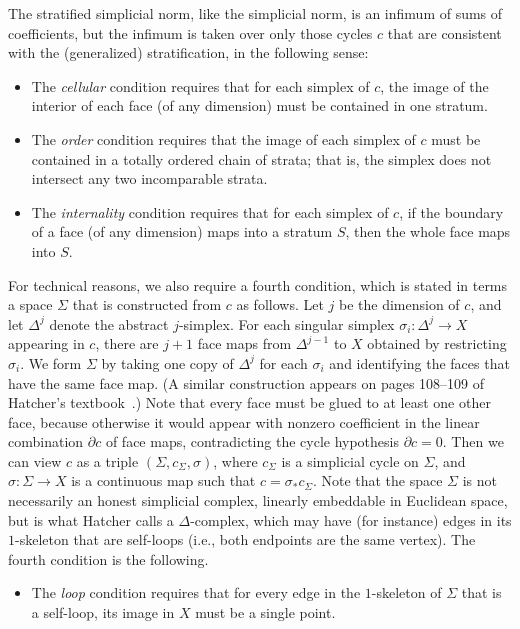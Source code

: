 \documentclass[psamsfonts]{amsart}
\theoremstyle{remark}
\newcommand{\del}{\partial}
\begin{document}
The stratified simplicial norm, like the simplicial norm, is an infimum of sums of coefficients, but the infimum is taken over only those cycles $c$ that are consistent with the (generalized) stratification, in the following sense:
\begin{itemize}
\item The \emph{cellular} condition requires that for each simplex of $c$, the image of the interior of each face (of any dimension) must be contained in one stratum.
\item The \emph{order} condition requires that the image of each simplex of $c$ must be contained in a totally ordered chain of strata; that is, the simplex does not intersect any two incomparable strata.  
\item The \emph{internality} condition requires that for each simplex of $c$, if the boundary of a face (of any dimension) maps into a stratum $S$, then the whole face maps into $S$.  
\end{itemize}
For technical reasons, we also require a fourth condition, which is stated in terms a space $\Sigma$ that is constructed from $c$ as follows.  Let $j$ be the dimension of $c$, and let $\Delta^j$ denote the abstract $j$-simplex.  For each singular simplex $\sigma_i : \Delta^j \rightarrow X$ appearing in $c$, there are $j+1$ face maps from $\Delta^{j-1}$ to $X$ obtained by restricting $\sigma_i$.  We form $\Sigma$ by taking one copy of $\Delta^j$ for each $\sigma_i$ and identifying the faces that have the same face map.  (A similar construction appears on pages 108--109 of Hatcher's textbook~\cite{Hatcher02}.)  Note that every face must be glued to at least one other face, because otherwise it would appear with nonzero coefficient in the linear combination $\del c$ of face maps, contradicting the cycle hypothesis $\del c = 0$.  Then we can view $c$ as a triple $(\Sigma, c_\Sigma, \sigma)$, where $c_\Sigma$ is a simplicial cycle on $\Sigma$, and $\sigma : \Sigma \rightarrow X$ is a continuous map such that $c = \sigma_*c_\Sigma$.  Note that the space $\Sigma$ is not necessarily an honest simplicial complex, linearly embeddable in Euclidean space, but is what Hatcher calls a $\Delta$-complex, which may have (for instance) edges in its $1$-skeleton that are self-loops (i.e., both endpoints are the same vertex).   The fourth condition is the following.
\begin{itemize}
\item The \emph{loop} condition requires that for every edge in the $1$-skeleton of $\Sigma$ that is a self-loop, its image in $X$ must be a single point.
\end{itemize}
\end{document}
